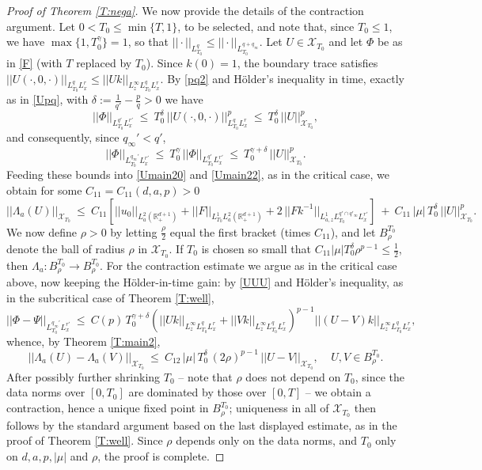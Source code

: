 \documentclass[11pt,letter]{amsart}
\def \RN {\mathbb{R}_+^{d+1}}
\numberwithin{equation}{section}
\numberwithin{equation}{section}
\begin{document}
\begin{proof}[Proof of Theorem \ref{T:nega}]
We now provide the details of the contraction argument. Let $0<T_0\le \min\{T,1\}$, to be selected, and note that, since $T_0\le1$, we have $\max\{1,T_0^{\gamma}\}=1$, so that $||\cdot||_{L^q_{T_0}}\le ||\cdot||_{L^{q+q_\infty}_{T_0}}$. Let $U\in \mathcal X_{T_0}$ and let $\Phi$ be as in \eqref{F} (with $T$ replaced by $T_0$). Since $k(0)=1$, the boundary trace satisfies $||U(\cdot,0,\cdot)||_{L^q_{T_0}L^r_x}\le ||Uk||_{L^\infty_zL^q_{T_0}L^r_x}$. By \eqref{pq2} and H\"older's inequality in time, exactly as in \eqref{Upq}, with $\delta := \frac{1}{q'}-\frac pq>0$ we have
\[
||\Phi||_{L^{q'}_{T_0}L^{r'}_x}\ \le\ T_0^{\delta}\, ||U(\cdot,0,\cdot)||^p_{L^q_{T_0}L^r_x}\ \le\ T_0^{\delta}\, ||U||^p_{\mathcal X_{T_0}},
\]
and consequently, since $q_\infty'<q'$,
\[
||\Phi||_{L^{q_\infty'}_{T_0}L^{r'}_x}\ \le\ T_0^{\gamma}\, ||\Phi||_{L^{q'}_{T_0}L^{r'}_x}\ \le\ T_0^{\gamma+\delta}\, ||U||^p_{\mathcal X_{T_0}} .
\]
Feeding these bounds into \eqref{Umain20} and \eqref{Umain22}, as in the critical case, we obtain for some $C_{11} = C_{11}(d,a,p)>0$
\[
||\Lambda_a(U)||_{\mathcal X_{T_0}}\ \le\ C_{11}\left[||u_0||_{L^2_a(\RN)} + ||F||_{L^1_{T_0}L^2_a(\RN)} + 2\, ||Fk^{-1}||_{L^1_{a,z}L^{q'\cap q'_\infty}_{T_0}L^{r'}_x}\right]\ +\ C_{11}\, |\mu|\, T_0^{\delta}\, ||U||^p_{\mathcal X_{T_0}} .
\]
We now define $\rho>0$ by letting $\frac\rho2$ equal the first bracket (times $C_{11}$), and let $B^{T_0}_\rho$ denote the ball of radius $\rho$ in $\mathcal X_{T_0}$. If $T_0$ is chosen so small that $C_{11}|\mu| T_0^{\delta}\rho^{p-1}\le \frac12$, then $\Lambda_a: B^{T_0}_\rho\to B^{T_0}_\rho$. For the contraction estimate we argue as in the critical case above, now keeping the H\"older-in-time gain: by \eqref{UUU} and H\"older's inequality, as in the subcritical case of Theorem \ref{T:well},
\[
||\Phi-\Psi||_{L^{q_\infty'}_{T_0}L^{r'}_x}\ \le\ C(p)\, T_0^{\gamma+\delta} \left(||Uk||_{L^\infty_zL^q_{T_0}L^r_x} + ||Vk||_{L^\infty_zL^q_{T_0}L^r_x}\right)^{p-1} ||(U-V)k||_{L^\infty_zL^q_{T_0}L^r_x},
\]
whence, by Theorem \ref{T:main2},
\[
||\Lambda_a(U)-\Lambda_a(V)||_{\mathcal X_{T_0}}\ \le\ C_{12}\, |\mu|\, T_0^{\delta}\, (2\rho)^{p-1}\, ||U-V||_{\mathcal X_{T_0}},\ \ \ \ \ U, V\in B^{T_0}_\rho .
\]
After possibly further shrinking $T_0$ -- note that $\rho$ does not depend on $T_0$, since the data norms over $[0,T_0]$ are dominated by those over $[0,T]$ -- we obtain a contraction, hence a unique fixed point in $B^{T_0}_\rho$; uniqueness in all of $\mathcal X_{T_0}$ then follows by the standard argument based on the last displayed estimate, as in the proof of Theorem \ref{T:well}. Since $\rho$ depends only on the data norms, and $T_0$ only on $d, a, p, |\mu|$ and $\rho$, the proof is complete. 

\end{proof}
\end{document}

